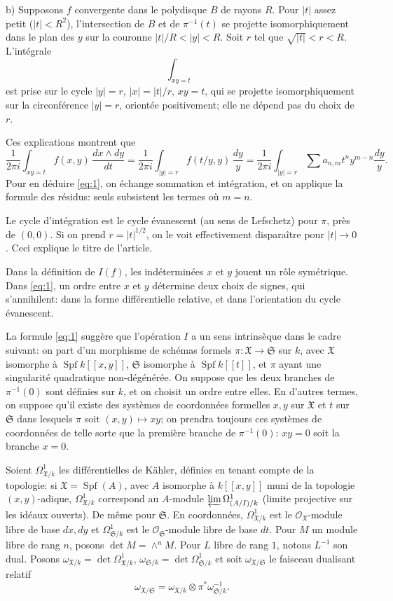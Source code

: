 \documentclass[12pt,a4paper]{article}
\theoremstyle{plain}
\theoremstyle{definition}
\theoremstyle{remark}
\DeclareMathOperator{\Spf}{Spf}
\newcommand{\OO}{\mathcal{O}}
\begin{document}
b) Supposons $f$ convergente dans le polydisque $B$ de rayons $R$. Pour $|t|$
assez petit ($|t|<R^2$), l'intersection de $B$ et de $\pi^{-1}(t)$ se projette
isomorphiquement dans le plan des $y$ sur la couronne $|t|/R<|y|<R$. Soit $r$
tel que $\sqrt{|t|}<r<R$. L'intégrale
\[
\int_{xy=t}
\]
est prise sur le cycle $|y|=r$, $|x|=|t|/r$, $xy=t$, qui se projette
isomorphiquement sur la circonférence $|y|=r$, orientée positivement; elle ne
dépend pas du choix de $r$.

Ces explications montrent que
\[
\frac{1}{2\pi i}\int_{xy=t} f(x,y)\,\frac{dx\wedge dy}{dt}
=\frac{1}{2\pi i}\int_{|y|=r} f(t/y,y)\,\frac{dy}{y}
=\frac{1}{2\pi i}\int_{|y|=r}\sum a_{n,m}t^n y^{m-n}\frac{dy}{y}.
\]
Pour en déduire \eqref{eq:1}, on échange sommation et intégration, et on applique la
formule des résidus: seuls subsistent les termes où $m=n$.

Le cycle d'intégration est le cycle évanescent (au sens de Lefschetz) pour $\pi$,
près de $(0,0)$. Si on prend $r=|t|^{1/2}$, on le voit effectivement disparaître pour
$|t|\to 0$. Ceci explique le titre de l'article.

Dans la définition de $I(f)$, les indéterminées $x$ et $y$ jouent un rôle
symétrique. Dans \eqref{eq:1}, un ordre entre $x$ et $y$ détermine deux choix de signes, qui
s'annihilent: dans la forme différentielle relative, et dans l'orientation du cycle
évanescent.

La formule \eqref{eq:1} suggère que l'opération $I$ a un sens intrinsèque dans le cadre
suivant: on part d'un morphisme de schémas formels $\pi:\mathfrak{X}\to\mathfrak{S}$ sur
$k$, avec $\mathfrak{X}$ isomorphe à $\Spf k[[x,y]]$, $\mathfrak{S}$ isomorphe à
$\Spf k[[t]]$, et $\pi$ ayant une singularité quadratique non-dégénérée. On suppose que
les deux branches de $\pi^{-1}(0)$ sont définies sur $k$, et on choisit un ordre entre
elles. En d'autres termes, on suppose qu'il existe des systèmes de coordonnées formelles
$x,y$ sur $\mathfrak{X}$ et $t$ sur $\mathfrak{S}$ dans lesquels $\pi$ soit
$(x,y)\mapsto xy$; on prendra toujours ces systèmes de coordonnées de telle sorte que la
première branche de $\pi^{-1}(0)$: $xy=0$ soit la branche $x=0$.

Soient $\Omega^1_{\mathfrak{X}/k}$ les différentielles de Kähler, définies en tenant
compte de la topologie: si $\mathfrak{X}=\Spf(A)$, avec $A$ isomorphe à $k[[x,y]]$
muni de la topologie $(x,y)$-adique, $\Omega^1_{\mathfrak{X}/k}$ correspond au $A$-module
$\varprojlim \Omega^1_{(A/I)/k}$ (limite projective sur les idéaux ouverts). De même
pour $\mathfrak{S}$. En coordonnées, $\Omega^1_{\mathfrak{X}/k}$ est le
$\OO_{\mathfrak{X}}$-module libre de base $dx,dy$ et $\Omega^1_{\mathfrak{S}/k}$ est le
$\OO_{\mathfrak{S}}$-module libre de base $dt$. Pour $M$ un module libre de rang $n$,
posons $\det M=\wedge^n M$. Pour $L$ libre de rang $1$, notons $L^{-1}$ son dual.
Posons $\omega_{\mathfrak{X}/k}=\det\Omega^1_{\mathfrak{X}/k}$,
$\omega_{\mathfrak{S}/k}=\det\Omega^1_{\mathfrak{S}/k}$ et soit
$\omega_{\mathfrak{X}/\mathfrak{S}}$ le faisceau dualisant relatif
\[
\omega_{\mathfrak{X}/\mathfrak{S}}=\omega_{\mathfrak{X}/k}\otimes\pi^*\omega_{\mathfrak{S}/k}^{-1}.
\]
\end{document}
